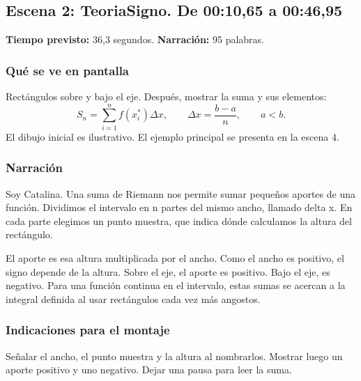 \documentclass[11pt,a4paper]{article}
\newcommand{\escena}[4]{\textbf{Escena #1: #2.} De #3 a #4}
\begin{document}
\noindent\begin{minipage}[t]{\textwidth}
\subsection*{\escena{2}{TeoriaSigno}{00:10,65}{00:46,95}}

\textbf{Tiempo previsto:} 36,3 segundos. \textbf{Narración:} 95 palabras.

\subsubsection*{Qué se ve en pantalla}
Rectángulos sobre y bajo el eje. Después, mostrar la suma y sus elementos:
\[
 S_n=\sum_{i=1}^{n}f(x_i^*)\Delta x,\qquad
 \Delta x=\frac{b-a}{n},\qquad a<b.
\]
El dibujo inicial es ilustrativo. El ejemplo principal se presenta en la escena 4.

\subsubsection*{Narración}
Soy Catalina. Una suma de Riemann nos permite sumar pequeños aportes de una función. Dividimos el intervalo en n partes del mismo ancho, llamado delta x. En cada parte elegimos un punto muestra, que indica dónde calculamos la altura del rectángulo.

El aporte es esa altura multiplicada por el ancho. Como el ancho es positivo, el signo depende de la altura. Sobre el eje, el aporte es positivo. Bajo el eje, es negativo. Para una función continua en el intervalo, estas sumas se acercan a la integral definida al usar rectángulos cada vez más angostos.

\subsubsection*{Indicaciones para el montaje}
Señalar el ancho, el punto muestra y la altura al nombrarlos. Mostrar luego un aporte positivo y uno negativo. Dejar una pausa para leer la suma.
\end{minipage}\par\medskip
\end{document}
